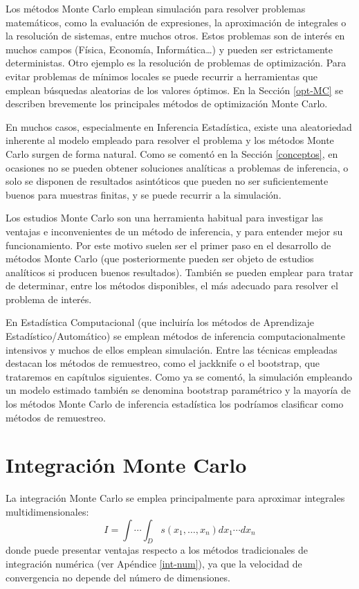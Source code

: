 \documentclass[
  spanish,
  10pt,
]{book}
\theoremstyle{break}
\theoremstyle{nonumberplain}
\begin{document}
Los métodos Monte Carlo emplean simulación para resolver problemas matemáticos, como la evaluación de expresiones, la aproximación de integrales o la resolución de sistemas, entre muchos otros.
Estos problemas son de interés en muchos campos (Física, Economía, Informática\ldots) y pueden ser estrictamente deterministas.
Otro ejemplo es la resolución de problemas de optimización.
Para evitar problemas de mínimos locales se puede recurrir a herramientas que emplean búsquedas aleatorias de los valores óptimos.
En la Sección \ref{opt-MC} se describen brevemente los principales métodos de optimización Monte Carlo.

En muchos casos, especialmente en Inferencia Estadística, existe una aleatoriedad inherente al modelo empleado para resolver el problema y los métodos Monte Carlo surgen de forma natural.
Como se comentó en la Sección \ref{conceptos}, en ocasiones no se pueden obtener soluciones analíticas a problemas de inferencia, o solo se disponen de resultados asintóticos que pueden no ser suficientemente buenos para muestras finitas, y se puede recurrir a la simulación.

Los estudios Monte Carlo son una herramienta habitual para investigar las ventajas e inconvenientes de un método de inferencia, y para entender mejor su funcionamiento.
Por este motivo suelen ser el primer paso en el desarrollo de métodos Monte Carlo (que posteriormente pueden ser objeto de estudios analíticos si producen buenos resultados).
También se pueden emplear para tratar de determinar, entre los métodos disponibles, el más adecuado para resolver el problema de interés.

En Estadística Computacional (que incluiría los métodos de Aprendizaje Estadístico/Automático) se emplean métodos de inferencia computacionalmente intensivos y muchos de ellos emplean simulación.
Entre las técnicas empleadas destacan los métodos de remuestreo, como el jackknife o el bootstrap, que trataremos en capítulos siguientes.
Como ya se comentó, la simulación empleando un modelo estimado también se denomina bootstrap paramétrico y la mayoría de los métodos Monte Carlo de inferencia estadística los podríamos clasificar como métodos de remuestreo.

\section{Integración Monte Carlo}\label{int-MC}

La integración Monte Carlo se emplea principalmente para aproximar integrales multidimensionales:
\[I = \int \cdots \int _D s\left( x_1,\ldots ,x_n\right) dx_1 \cdots dx_n\]
donde puede presentar ventajas respecto a los métodos tradicionales de integración numérica (ver Apéndice \ref{int-num}), ya que la velocidad de convergencia no depende del número de dimensiones.
\end{document}

